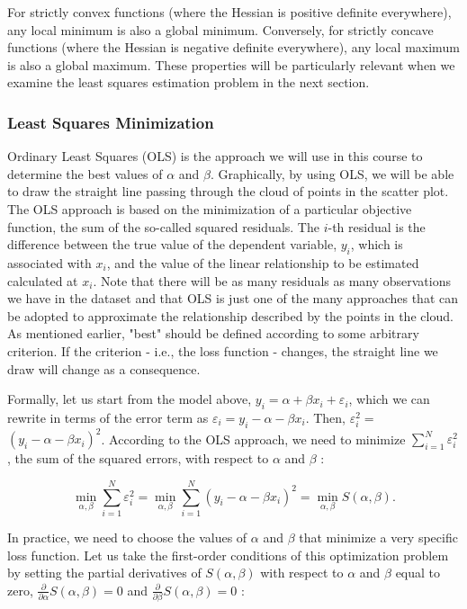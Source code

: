 For strictly convex functions (where the Hessian is positive definite everywhere), any local minimum is also a global minimum. Conversely, for strictly concave functions (where the Hessian is negative definite everywhere), any local maximum is also a global maximum. These properties will be particularly relevant when we examine the least squares estimation problem in the next section.

\subsubsection{Least Squares Minimization}

Ordinary Least Squares (OLS) is the approach we will use in this course to determine the best values of $\alpha$ and $\beta$. Graphically, by using OLS, we will be able to draw the straight line passing through the cloud of points in the scatter plot. The OLS approach is based on the minimization of a particular objective function, the sum of the so-called squared residuals. The $i$-th residual is the difference between the true value of the dependent variable, $y_{i}$, which is associated with $x_{i}$, and the value of the linear relationship to be estimated calculated at $x_{i}$. Note that there will be as many residuals as many observations we have in the dataset and that OLS is just one of the many approaches that can be adopted to approximate the relationship described by the points in the cloud. As mentioned earlier, "best" should be defined according to some arbitrary criterion. If the criterion - i.e., the loss function - changes, the straight line we draw will change as a consequence.

Formally, let us start from the model above, $y_{i}=\alpha+\beta x_{i}+\varepsilon_{i}$, which we can rewrite in terms of the error term as $\varepsilon_{i}=y_{i}-\alpha-\beta x_{i}$. Then, $\varepsilon_{i}^{2}=$\\
$\left(y_{i}-\alpha-\beta x_{i}\right)^{2}$. According to the OLS approach, we need to minimize $\sum_{i=1}^{N} \varepsilon_{i}^{2}$, the sum of the squared errors, with respect to $\alpha$ and $\beta$ :

$$
\min _{\alpha, \beta} \sum_{i=1}^{N} \varepsilon_{i}^{2}=\min _{\alpha, \beta} \sum_{i=1}^{N}\left(y_{i}-\alpha-\beta x_{i}\right)^{2}=\min _{\alpha, \beta} S(\alpha, \beta) .
$$

In practice, we need to choose the values of $\alpha$ and $\beta$ that minimize a very specific loss function. Let us take the first-order conditions of this optimization problem by setting the partial derivatives of $S(\alpha, \beta)$ with respect to $\alpha$ and $\beta$ equal to zero, $\frac{\partial}{\partial \alpha} S(\alpha, \beta)=0$ and $\frac{\partial}{\partial \beta} S(\alpha, \beta)=0$ :

